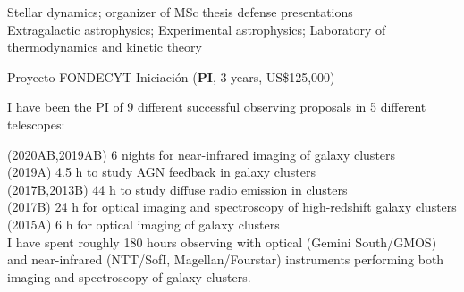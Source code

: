 \documentclass[11pt]{article}
\begin{document}

\noindent
{} Stellar dynamics; organizer of MSc thesis defense presentations\\
 Extragalactic astrophysics; Experimental astrophysics; Laboratory of thermodynamics and kinetic theory\\

\hline



\noindent
{} Proyecto FONDECYT Iniciaci\'on (\textbf{PI}, 3 years, US\$125,000)



\noindent
I have been the PI of 9 different successful observing proposals in 5 different telescopes:

\noindent
{} (2020AB,2019AB) 6 nights for near-infrared imaging of galaxy clusters\\
 (2019A) 4.5 h to study AGN feedback in galaxy clusters\\
 (2017B,2013B) 44 h to study diffuse radio emission in clusters\\
 (2017B) 24 h for optical imaging and spectroscopy of high-redshift galaxy clusters\\
 (2015A) 6 h for optical imaging of galaxy clusters\\


{I have spent roughly 180 hours observing with 
optical (Gemini South/GMOS) and near-infrared (NTT/SofI, Magellan/Fourstar) instruments performing both 
imaging and spectroscopy of galaxy clusters.}


%

\end{document}
